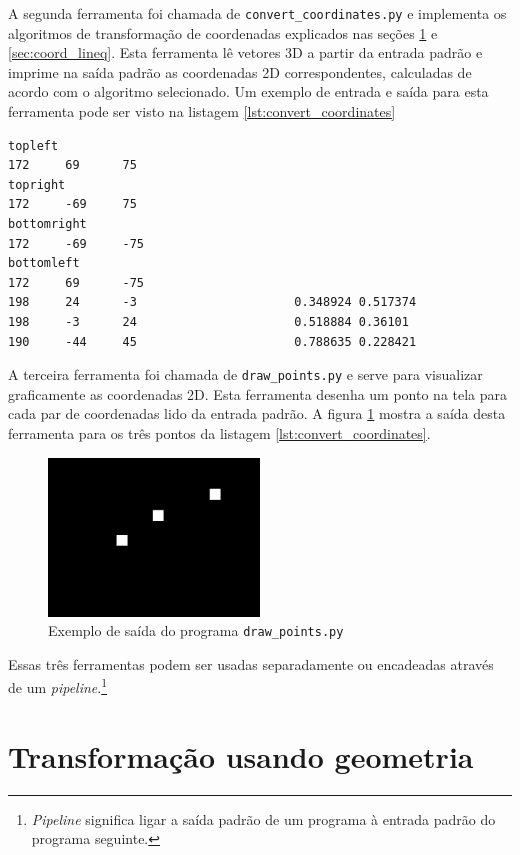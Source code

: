 \documentclass[brazil,pagestart=firstchapter]{abnt}
\begin{document}
A segunda ferramenta foi chamada de \texttt{convert\_coordinates.py} e
implementa os algoritmos de transformação de coordenadas explicados nas
seções \ref{sec:coord_geometria} e \ref{sec:coord_lineq}.  Esta ferramenta
lê vetores 3D a partir da entrada padrão e imprime na saída padrão as
coordenadas 2D correspondentes, calculadas de acordo com o algoritmo
selecionado. Um exemplo de entrada e saída para esta ferramenta pode ser
visto na listagem \ref{lst:convert_coordinates}

\begin{lstlisting}[numbers=none, float=h, label={lst:convert_coordinates},
caption={Entrada para o programa \texttt{convert\_coordinates.py} e a saída correspondente}
]
topleft
172     69      75
topright
172     -69     75
bottomright
172     -69     -75
bottomleft
172     69      -75
198     24      -3                      0.348924 0.517374
198     -3      24                      0.518884 0.36101
190     -44     45                      0.788635 0.228421
\end{lstlisting}

A terceira ferramenta foi chamada de \texttt{draw\_points.py} e serve para
visualizar graficamente as coordenadas 2D. Esta ferramenta desenha um ponto
na tela para cada par de coordenadas lido da entrada padrão. A figura
\ref{fig:draw_points} mostra a saída desta ferramenta para os três pontos da
listagem \ref{lst:convert_coordinates}.

\begin{figure}[h]
\centering
\includegraphics[width=0.5\textwidth]{img/draw_points_example.png}
\caption{Exemplo de saída do programa \texttt{draw\_points.py}}
\label{fig:draw_points}
\end{figure}

Essas três ferramentas podem ser usadas separadamente ou encadeadas através
de um \textit{pipeline}.\footnote{
	\textit{Pipeline} significa ligar a saída padrão de um programa à
	entrada padrão do programa seguinte.
}


\section{Transformação usando geometria}
\label{sec:coord_geometria}
\end{document}
